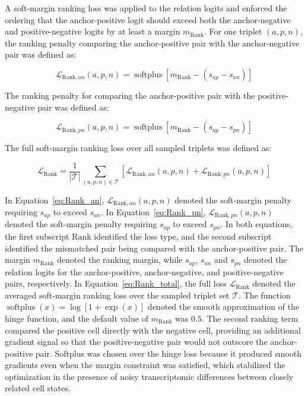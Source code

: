 \documentclass[11pt]{article}
\begin{document}
A soft-margin ranking loss was applied to the relation logits and enforced the ordering that the anchor-positive logit should exceed both the anchor-negative and positive-negative logits by at least a margin \(m_{\mathrm{Rank}}\). For one triplet \((a,p,n)\), the ranking penalty comparing the anchor-positive pair with the anchor-negative pair was defined as:

\begin{equation}
\mathcal{L}_{\mathrm{Rank},an}(a,p,n)=
\operatorname{softplus}
\left[
m_{\mathrm{Rank}}-(s_{ap}-s_{an})
\right]
  \label{eq:Rank_an}
\end{equation}

The ranking penalty for comparing the anchor-positive pair with the positive-negative pair was defined as:

\begin{equation}
\mathcal{L}_{\mathrm{Rank},pn}(a,p,n)=
\operatorname{softplus}
\left[
m_{\mathrm{Rank}}-(s_{ap}-s_{pn})
\right]
  \label{eq:Rank_pn}
\end{equation}

The full soft-margin ranking loss over all sampled triplets was defined as:

\begin{equation}
\mathcal{L}_{\mathrm{Rank}}=
\frac{1}{|\mathcal{T}|}
\sum_{(a,p,n)\in\mathcal{T}}
\left[
\mathcal{L}_{\mathrm{Rank},an}(a,p,n)
+
\mathcal{L}_{\mathrm{Rank},pn}(a,p,n)
\right]
  \label{eq:Rank_total}
\end{equation}

In Equation~\ref{eq:Rank_an}, \(\mathcal{L}_{\mathrm{Rank},an}(a,p,n)\) denoted the soft-margin penalty requiring \(s_{ap}\) to exceed \(s_{an}\). In Equation~\ref{eq:Rank_pn}, \(\mathcal{L}_{\mathrm{Rank},pn}(a,p,n)\) denoted the soft-margin penalty requiring \(s_{ap}\) to exceed \(s_{pn}\). In both equations, the first subscript \(\mathrm{Rank}\) identified the loss type, and the second subscript identified the mismatched pair being compared with the anchor-positive pair. The margin \(m_{\mathrm{Rank}}\) denoted the ranking margin, while \(s_{ap}\), \(s_{an}\) and \(s_{pn}\) denoted the relation logits for the anchor-positive, anchor-negative, and positive-negative pairs, respectively. In Equation~\ref{eq:Rank_total}, the full loss \(\mathcal{L}_{\mathrm{Rank}}\) denoted the averaged soft-margin ranking loss over the sampled triplet set \(\mathcal{T}\). The function $\operatorname{softplus}(x)=\log[1+\exp(x)]$ denoted the smooth approximation of the hinge function, and the default value of \(m_{\mathrm{Rank}}\) was $0.5$. The second ranking term compared the positive cell directly with the negative cell, providing an additional gradient signal so that the positive-negative pair would not outscore the anchor-positive pair. Softplus was chosen over the hinge loss because it produced smooth gradients even when the margin constraint was satisfied, which stabilized the optimization in the presence of noisy transcriptomic differences between closely related cell states.
\end{document}

